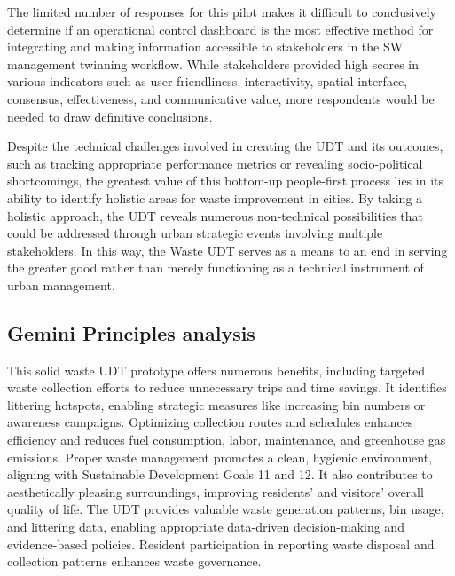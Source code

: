 \documentclass[authoryear,preprint,review,11pt,doubleblind]{elsarticle}
\begin{document}
    The limited number of responses for this pilot makes it difficult to conclusively determine if an operational control dashboard is the most effective method for integrating and making information accessible to stakeholders in the SW management twinning workflow. While stakeholders provided high scores in various indicators such as user-friendliness, interactivity, spatial interface, consensus, effectiveness, and communicative value, more respondents would be needed to draw definitive conclusions.

     Despite the technical challenges involved in creating the UDT and its outcomes, such as tracking appropriate performance metrics or revealing socio-political shortcomings, the greatest value of this bottom-up people-first process lies in its ability to identify holistic areas for waste improvement in cities. By taking a holistic approach, the UDT reveals numerous non-technical possibilities that could be addressed through urban strategic events involving multiple stakeholders. In this way, the Waste UDT serves as a means to an end in serving the greater good rather than merely functioning as a technical instrument of urban management.

\subsection{Gemini Principles analysis} \label{subsec:Gemini}
    This solid waste UDT prototype offers numerous benefits, including targeted waste collection efforts to reduce unnecessary trips and time savings. It identifies littering hotspots, enabling strategic measures like increasing bin numbers or awareness campaigns. Optimizing collection routes and schedules enhances efficiency and reduces fuel consumption, labor, maintenance, and greenhouse gas emissions. Proper waste management promotes a clean, hygienic environment, aligning with Sustainable Development Goals 11 and 12. It also contributes to aesthetically pleasing surroundings, improving residents' and visitors' overall quality of life. The UDT provides valuable waste generation patterns, bin usage, and littering data, enabling appropriate data-driven decision-making and evidence-based policies. Resident participation in reporting waste disposal and collection patterns enhances waste governance.
    
\end{document}
